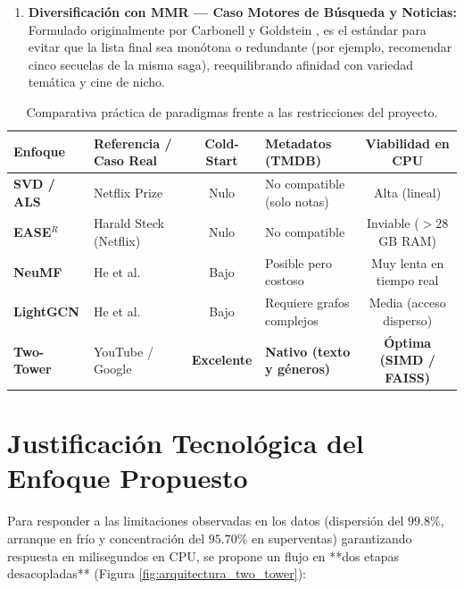 \documentclass[a4paper,11pt]{article}
\begin{document}
\begin{enumerate}
    \item \textbf{Diversificación con MMR --- Caso Motores de Búsqueda y Noticias:}
    Formulado originalmente por Carbonell y Goldstein \cite{carbonell1998}, es el estándar para evitar que la lista final sea monótona o redundante (por ejemplo, recomendar cinco secuelas de la misma saga), reequilibrando afinidad con variedad temática y cine de nicho.
\end{enumerate}

\begin{table}[!htbp]
    \centering
    \small
    \setlength{\tabcolsep}{5pt}
    \caption{Comparativa práctica de paradigmas frente a las restricciones del proyecto.}
    \label{tab:comparativa_modelos}
    \begin{tabularx}{\textwidth}{p{2.6cm} p{3.2cm} c X c}
        \toprule
        \textbf{Enfoque} & \textbf{Referencia / Caso Real} & \textbf{Cold-Start} & \textbf{Metadatos (TMDB)} & \textbf{Viabilidad en CPU} \\ 
        \midrule
        \textbf{SVD / ALS} & Netflix Prize \cite{koren2009} & Nulo & No compatible (solo notas) & Alta (lineal) \\
        \textbf{EASE$^R$} & Harald Steck (Netflix) \cite{steck2019} & Nulo & No compatible & Inviable ($>28$ GB RAM) \\
        \textbf{NeuMF} & He et al. \cite{he2017} & Bajo & Posible pero costoso & Muy lenta en tiempo real \\
        \textbf{LightGCN} & He et al. \cite{he2020} & Bajo & Requiere grafos complejos & Media (acceso disperso) \\
        \textbf{Two-Tower} & YouTube / Google \cite{yi2019} & \textbf{Excelente} & \textbf{Nativo (texto y géneros)} & \textbf{Óptima (SIMD / FAISS)} \\ 
        \bottomrule
    \end{tabularx}
\end{table}

\section{Justificación Tecnológica del Enfoque Propuesto}

Para responder a las limitaciones observadas en los datos (dispersión del $99.8\%$, arranque en frío y concentración del $95.70\%$ en superventas) garantizando respuesta en milisegundos en CPU, se propone un flujo en **dos etapas desacopladas** (Figura \ref{fig:arquitectura_two_tower}):
\end{document}
